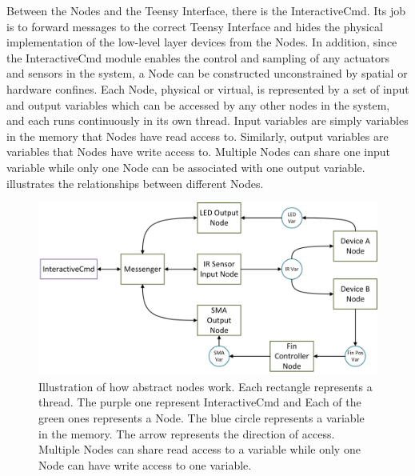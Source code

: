 Between the Nodes and the Teensy Interface, there is the InteractiveCmd. Its job is to forward messages to the correct Teensy Interface and hides the physical implementation of the low-level layer devices from the Nodes. In addition, since the InteractiveCmd module enables the control and sampling of any actuators and sensors in the system, a Node can be constructed unconstrained by spatial or hardware confines. Each Node, physical or virtual, is represented by a set of input and output variables which can be accessed by any other nodes in the system, and each runs continuously in its own thread. Input variables are simply variables in the memory that Nodes have read access to. Similarly, output variables are variables that Nodes have write access to. Multiple Nodes can share one input variable while only one Node can be associated with one output variable.  illustrates the relationships between different Nodes. 

\begin{figure}[!htbp]
	\centering
	\includegraphics[width=1.0 \textwidth]{"fig/interactive control system/Node_abstraction"}
	\caption[Illustration of how abstract nodes work]{Illustration of how abstract nodes work. Each rectangle represents a thread. The purple one represent InteractiveCmd and Each of the green ones represents a Node. The blue circle represents a variable in the memory. The arrow represents the direction of access. Multiple Nodes can share read access to a variable while only one Node can have write access to one variable.}
	\label{fig:Node_abstraction}
\end{figure}

